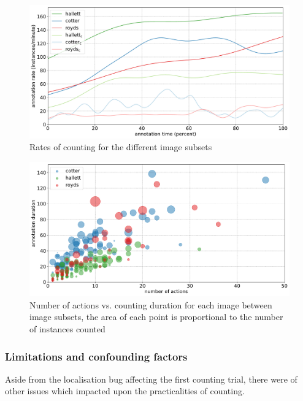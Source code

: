 \begin{figure}[ht]
\centering
\includegraphics[width=1.0\linewidth]{charts/aerial_penguins/summaries/instance_rates.pdf}
\caption{ Rates of counting for the different image subsets }
\label{fig:penguin_rates}
\end{figure}

\begin{figure}[ht]
\centering
\includegraphics[width=1.0\linewidth]{charts/aerial_penguins/actions_time_a.pdf}
\caption{ Number of actions vs. counting duration for each image between image subsets, the area of each point is proportional to the number of instances counted }
\label{fig:actions_time_penguins}
\end{figure}


\subsubsection{Limitations and confounding factors}

Aside from the localisation bug affecting the first counting trial, there were of other issues which impacted upon the practicalities of  counting.

